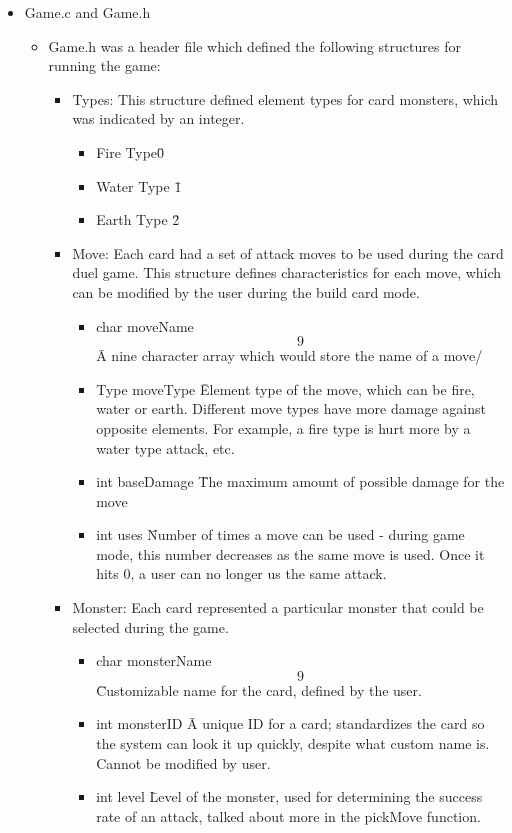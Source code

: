 \documentclass[12pt]{article} %
\begin{document}

\begin{itemize}
	\item Game.c and Game.h
		\begin{itemize}
			\item Game.h was a header file which defined the following structures for running the game:
				\begin{itemize}
					\item Types: This structure defined element types for card monsters, which was indicated by an integer.
						\begin{itemize}
							\item Fire Type\= 0
							\item Water Type \= 1
							\item Earth Type \= 2
						\end {itemize}
					\item Move: Each card had a set of attack moves to be used during the card duel game. This structure defines characteristics for each move, which can be modified by the user during the build card mode.
						\begin{itemize}
							\item char moveName\[9\] \= A nine character array which would store the name of a move/
							\item Type moveType \= Element type of the move, which can be fire, water or earth. Different move types have more damage against opposite elements. For example, a fire type is hurt more by a water type attack, etc.
							\item int baseDamage \= The maximum amount of possible damage for the move
							\item int uses \= Number of times a move can be used - during game mode, this number decreases as the same move is used. Once it hits 0, a user can no longer us the same attack.
						\end{itemize}
					\item Monster: Each card represented a particular monster that could be selected during the game.
						\begin{itemize}
							\item char monsterName\[9\] \= Customizable name for the card, defined by the user.
							\item int monsterID \= A unique ID for a card; standardizes the card so the system can look it up quickly, despite what custom name is. Cannot be modified by user.
							\item int level \= Level of the monster, used for determining the success rate of an attack, talked about more in the pickMove function.

\end{itemize}
\end{itemize}
\end{itemize}
\end{itemize}
\end{document}
